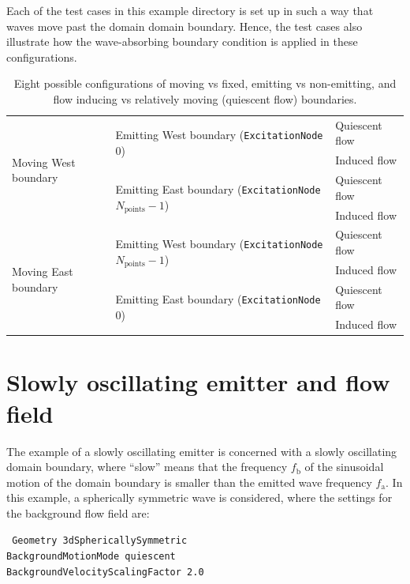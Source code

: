 Each of the test cases in this example directory is set up in such a way that waves move past the domain domain boundary. Hence, the test cases also illustrate how the wave-absorbing boundary condition is applied in these configurations.


\begin{table}[htb]
\centering
\begin{tabular}{|l|l|l|}
\hline
\multirow{4}{*}{Moving West boundary} & \multirow{2}{*}{Emitting West boundary ({\tt ExcitationNode} 0)} & Quiescent flow \\
\cline{3-3}
& & Induced flow \\
\cline{2-3}
& \multirow{2}{*}{Emitting East boundary ({\tt ExcitationNode} $N_{\mathrm{points}}-1$)} & Quiescent flow \\
\cline{3-3}
& & Induced flow \\
\cline{1-3}
\multirow{4}{*}{Moving East boundary} & \multirow{2}{*}{Emitting West boundary ({\tt ExcitationNode} $N_{\mathrm{points}}-1$)} & Quiescent flow \\
\cline{3-3}
& & Induced flow \\
\cline{2-3}
& \multirow{2}{*}{Emitting East boundary ({\tt ExcitationNode} $0$)} & Quiescent flow \\
\cline{3-3}
& & Induced flow \\
\hline
\end{tabular}
\caption{Eight possible configurations of moving vs fixed, emitting vs non-emitting, and flow inducing vs relatively moving (quiescent flow) boundaries.}
\label{tab:hierarchyMotion}
\end{table}


\section{Slowly oscillating emitter and flow field}
\label{sec:Slowly oscillating emitter and flow field}


The example of a slowly oscillating emitter is concerned with a slowly oscillating domain boundary, where ``slow'' means that the frequency $f_{\mathrm{b}}$ of the sinusoidal motion of the domain boundary is smaller than the emitted wave frequency $f_{\mathrm{a}}$. In this example, a spherically symmetric wave is considered, where the settings for the background flow field are:

{\tt
Geometry 3dSphericallySymmetric \\
BackgroundMotionMode quiescent \\
BackgroundVelocityScalingFactor 2.0
}

